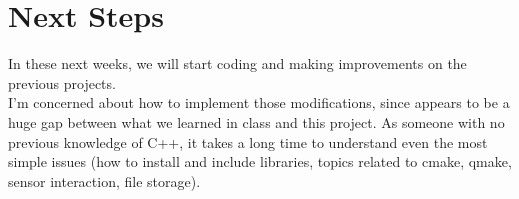 \documentclass[aps,letterpaper,11pt]{revtex4}
\begin{document}
\section{Next Steps}
In these next weeks, we will start coding and making improvements on the previous projects.\\
I'm concerned about how to implement those modifications, since appears to be a huge gap between what we learned in class and this project. As someone with no previous knowledge of C++, it takes a long time to understand even the most simple issues (how to install and include libraries, topics related to cmake, qmake, sensor interaction, file storage).
\\
\end{document}
